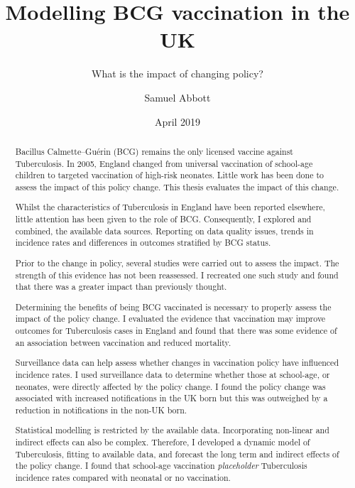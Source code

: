 \documentclass[11pt,twoside]{bristolthesis}
\title{Modelling BCG vaccination in the UK}
\subtitle{What is the impact of changing policy?}
\author{Samuel Abbott}
\date{April 2019}
\begin{document}
  \maketitle

  \frontmatter %

      \begin{abstract}
      Bacillus Calmette--Guérin (BCG) remains the only licensed vaccine against Tuberculosis. In 2005, England changed from universal vaccination of school-age children to targeted vaccination of high-risk neonates. Little work has been done to assess the impact of this policy change. This thesis evaluates the impact of this change.
      
      \par
      
      Whilst the characteristics of Tuberculosis in England have been reported elsewhere, little attention has been given to the role of BCG. Consequently, I explored and combined, the available data sources. Reporting on data quality issues, trends in incidence rates and differences in outcomes stratified by BCG status.
      
      \par
      
      Prior to the change in policy, several studies were carried out to assess the impact. The strength of this evidence has not been reassessed. I recreated one such study and found that there was a greater impact than previously thought.
      
      \par
      
      Determining the benefits of being BCG vaccinated is necessary to properly assess the impact of the policy change. I evaluated the evidence that vaccination may improve outcomes for Tuberculosis cases in England and found that there was some evidence of an association between vaccination and reduced mortality.
      
      \par
      
      Surveillance data can help assess whether changes in vaccination policy have influenced incidence rates. I used surveillance data to determine whether those at school-age, or neonates, were directly affected by the policy change. I found the policy change was associated with increased notifications in the UK born but this was outweighed by a reduction in notifications in the non-UK born.
      
      \par
      
      Statistical modelling is restricted by the available data. Incorporating non-linear and indirect effects can also be complex. Therefore, I developed a dynamic model of Tuberculosis, fitting to available data, and forecast the long term and indirect effects of the policy change. I found that school-age vaccination \emph{placeholder} Tuberculosis incidence rates compared with neonatal or no vaccination.
    \end{abstract}
\end{document}
